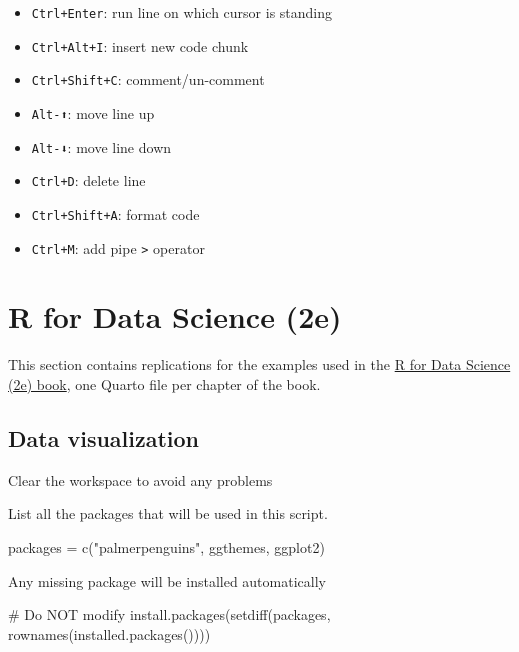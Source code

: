 \documentclass[
  letterpaper,
  DIV=11,
  numbers=noendperiod]{scrreprt}
\newenvironment{Shaded}{\begin{snugshade}}{\end{snugshade}}
\newcommand{\CommentTok}[1]{\textcolor[rgb]{0.37,0.37,0.37}{#1}}
\newcommand{\FunctionTok}[1]{\textcolor[rgb]{0.28,0.35,0.67}{#1}}
\newcommand{\NormalTok}[1]{\textcolor[rgb]{0.00,0.23,0.31}{#1}}
\newcommand{\OtherTok}[1]{\textcolor[rgb]{0.00,0.23,0.31}{#1}}
\newcommand{\StringTok}[1]{\textcolor[rgb]{0.13,0.47,0.30}{#1}}
\providecommand{\tightlist}{%
  \setlength{\itemsep}{0pt}\setlength{\parskip}{0pt}}\usepackage{longtable,booktabs,array}
\begin{document}
\begin{itemize}
\tightlist
\item
  \texttt{Ctrl+Enter}: run line on which cursor is standing
\item
  \texttt{Ctrl+Alt+I}: insert new code chunk
\item
  \texttt{Ctrl+Shift+C}: comment/un-comment
\item
  \texttt{Alt-⬆️}: move line up
\item
  \texttt{Alt-⬇️️}: move line down
\item
  \texttt{Ctrl+D}: delete line
\item
  \texttt{Ctrl+Shift+A}: format code
\item
  \texttt{Ctrl+M}: add pipe \texttt{\textbar{}\textgreater{}} operator
\end{itemize}

\part{R for Data Science (2e)}

This section contains replications for the examples used in the
\href{https://r4ds.hadley.nz/}{R for Data Science (2e) book}, one Quarto
file per chapter of the book.

\chapter{Data visualization}\label{data-visualization}

Clear the workspace to avoid any problems

List all the packages that will be used in this script.

\begin{Shaded}
\begin{Highlighting}[]
\NormalTok{packages }\OtherTok{=} \FunctionTok{c}\NormalTok{(}\StringTok{"palmerpenguins"}\NormalTok{, }\StringTok{\textquotesingle{}ggthemes\textquotesingle{}}\NormalTok{, }\StringTok{\textquotesingle{}ggplot2\textquotesingle{}}\NormalTok{)}
\end{Highlighting}
\end{Shaded}

Any missing package will be installed automatically

\begin{Shaded}
\begin{Highlighting}[]
\CommentTok{\# Do NOT modify}
\FunctionTok{install.packages}\NormalTok{(}\FunctionTok{setdiff}\NormalTok{(packages, }\FunctionTok{rownames}\NormalTok{(}\FunctionTok{installed.packages}\NormalTok{())))}
\end{Highlighting}
\end{Shaded}
\end{document}

